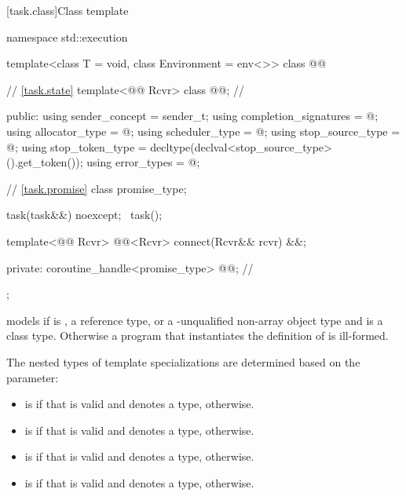 [task.class]{Class template }

\begin{codeblock}
namespace std::execution {
  template<class T = void, class Environment = env<>>
  class @@ {
    // \ref{task.state}
    template<@@ Rcvr>
      class @@;                              // \expos

  public:
    using sender_concept = sender_t;
    using completion_signatures = @\seebelow@;
    using allocator_type = @\seebelow@;
    using scheduler_type = @\seebelow@;
    using stop_source_type = @\seebelow@;
    using stop_token_type = decltype(declval<stop_source_type>().get_token());
    using error_types = @\seebelow@;

    // \ref{task.promise}
    class promise_type;

    task(task&&) noexcept;
    ~task();

    template<@@ Rcvr>
      @@<Rcvr> connect(Rcvr&& rcvr) &&;

  private:
    coroutine_handle<promise_type> @@;      // \expos
  };
}
\end{codeblock}

\pnum
{} models 
if  is , a reference type, or a \cv{}-unqualified
non-array object type and  is a class type.
Otherwise a program that instantiates the definition of 
is ill-formed.

\pnum
The nested types of  template specializations
are determined based on the  parameter:
\begin{itemize}
\item {} is 
if that  is valid and denotes a type,
 otherwise.
\item {} is 
if that  is valid and denotes a type,
 otherwise.
\item {} is 
if that  is valid and denotes a type,
 otherwise.
\item {} is  if
that  is valid and denotes a type,
 otherwise.
\end{itemize}

